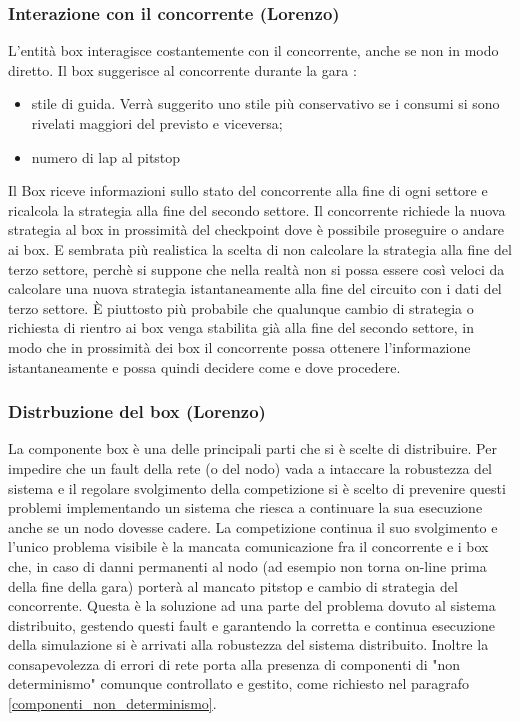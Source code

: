 \subsubsection{Interazione con il concorrente (Lorenzo)}
L'entità box interagisce costantemente con il concorrente, anche se non in modo diretto.
Il box suggerisce al concorrente durante la gara :
\begin{itemize}
\item stile di guida. Verrà suggerito uno stile più conservativo se i consumi si sono rivelati maggiori del previsto e viceversa;
\item numero di lap al pitstop
\end{itemize}
Il Box riceve informazioni sullo stato del concorrente alla fine di ogni settore e ricalcola la strategia alla fine del secondo settore. Il concorrente richiede la  nuova strategia al box in prossimità del checkpoint dove è possibile proseguire o andare ai box.
E sembrata più realistica la scelta di non calcolare la strategia alla fine del terzo settore, perchè si suppone che nella realtà non si possa essere così veloci da calcolare una nuova strategia istantaneamente alla fine del circuito con i dati del terzo settore. \`{E} piuttosto più probabile che qualunque cambio di strategia o richiesta di rientro ai box venga stabilita già alla fine del secondo settore, in modo che in prossimità dei box il concorrente possa ottenere l’informazione istantaneamente e possa quindi decidere come e dove procedere.
     \subsubsection{Distrbuzione del box (Lorenzo)}
La componente box è una delle principali parti che si è scelte di distribuire. Per impedire che un fault della rete (o del nodo) vada a intaccare la robustezza del sistema e il regolare svolgimento della competizione si è scelto di prevenire questi problemi implementando un sistema che riesca a continuare la sua esecuzione anche se un nodo dovesse cadere. La competizione continua il suo svolgimento e l'unico problema visibile è la mancata comunicazione fra il concorrente e i box che, in caso di danni permanenti al nodo (ad esempio non torna on-line prima della fine della gara) porterà al mancato pitstop e cambio di strategia del concorrente. Questa è la soluzione ad una parte del problema dovuto al sistema distribuito, gestendo questi fault e garantendo la corretta e continua esecuzione della simulazione si è arrivati alla robustezza del sistema distribuito.
Inoltre la consapevolezza di errori di rete porta alla presenza di componenti di "non determinismo" comunque controllato e gestito, come richiesto nel paragrafo \ref{componenti_non_determinismo}.
